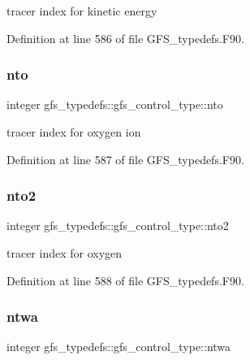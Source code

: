tracer index for kinetic energy 



Definition at line 586 of file G\+F\+S\+\_\+typedefs.\+F90.

\mbox{\label{structgfs__typedefs_1_1gfs__control__type_a3e21c72583de51f88a226aac16fe37e0}} 
\subsubsection{nto}
{\footnotesize\ttfamily integer gfs\+\_\+typedefs\+::gfs\+\_\+control\+\_\+type\+::nto}



tracer index for oxygen ion 



Definition at line 587 of file G\+F\+S\+\_\+typedefs.\+F90.

\mbox{\label{structgfs__typedefs_1_1gfs__control__type_a109eb979035e8ae724ec142aee935957}} 
\subsubsection{nto2}
{\footnotesize\ttfamily integer gfs\+\_\+typedefs\+::gfs\+\_\+control\+\_\+type\+::nto2}



tracer index for oxygen 



Definition at line 588 of file G\+F\+S\+\_\+typedefs.\+F90.

\mbox{\label{structgfs__typedefs_1_1gfs__control__type_a0ef5b32ba85d1cda7cdc0d53495f0955}} 
\subsubsection{ntwa}
{\footnotesize\ttfamily integer gfs\+\_\+typedefs\+::gfs\+\_\+control\+\_\+type\+::ntwa}



